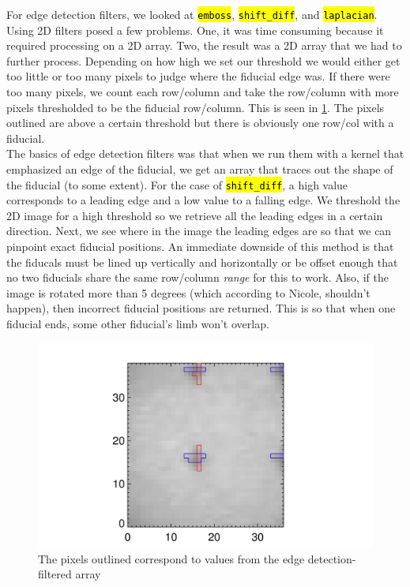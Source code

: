 \documentclass[10pt]{scrartcl}
\begin{document}
For edge detection filters, we looked at \hl{\texttt{emboss}}, \hl{\texttt{shift\_diff}}, and \hl{\texttt{laplacian}}. Using 2D filters posed a few problems. One, it was time consuming because it required processing on a 2D array. Two, the result was a 2D array that we had to further process. Depending on how high we set our threshold we would either get too little or too many pixels to judge where the fiducial edge was. If there were too many pixels, we count each row/column and take the row/column with more pixels thresholded to be the fiducial row/column. This is seen in \cref{edge_det}. The pixels outlined are above a certain threshold  but there is obviously one row/col with a fiducial.\\

The basics of edge detection filters was that when we run them with a kernel that emphasized an edge of the fiducial, we get an array that traces out the shape of the fiducial (to some extent). For the case of \hl{\texttt{shift\_diff}}, a high value corresponds to a leading edge and a low value to a falling edge. We threshold the 2D image for a high threshold so we retrieve all the leading edges in a certain direction. Next, we see where in the image the leading edges are so that we can pinpoint exact fiducial positions. An immediate downside of this method is that the fiducals must be lined up vertically and horizontally or be offset enough that no two fiducials share the same row/column \emph{range} for this to work. Also, if the image is rotated more than 5 degrees (which according to Nicole, shouldn't happen), then incorrect fiducial positions are returned. This is so that when one fiducial ends, some other fiducial's limb won't overlap.

\begin{figure}[!ht]
   \includegraphics[width=.75\textwidth]{../plots_tables_images/threshtesh_3.png}%
   \caption{The pixels outlined correspond to values from the edge detection-filtered array}\label{edge_det}
\end{figure}
\end{document}
